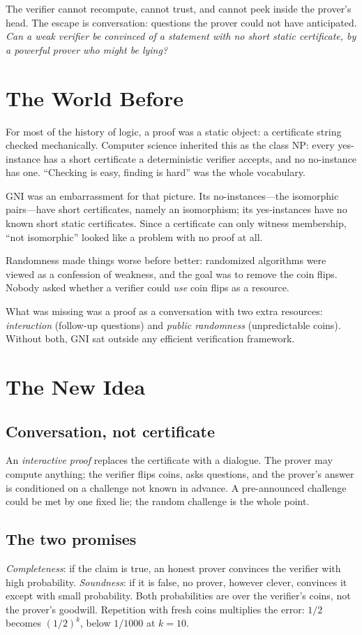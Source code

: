 The verifier cannot recompute, cannot trust, and cannot peek inside the prover's head. The escape is conversation: questions the prover could not have anticipated. \emph{Can a weak verifier be convinced of a statement with no short static certificate, by a powerful prover who might be lying?}

\section{The World Before}
For most of the history of logic, a proof was a static object: a certificate string checked mechanically. Computer science inherited this as the class NP: every yes-instance has a short certificate a deterministic verifier accepts, and no no-instance has one. ``Checking is easy, finding is hard'' was the whole vocabulary.

GNI was an embarrassment for that picture. Its no-instances---the isomorphic pairs---have short certificates, namely an isomorphism; its yes-instances have no known short static certificates. Since a certificate can only witness membership, ``not isomorphic'' looked like a problem with no proof at all.

Randomness made things worse before better: randomized algorithms were viewed as a confession of weakness, and the goal was to remove the coin flips. Nobody asked whether a verifier could \emph{use} coin flips as a resource.

What was missing was a proof as a conversation with two extra resources: \emph{interaction} (follow-up questions) and \emph{public randomness} (unpredictable coins). Without both, GNI sat outside any efficient verification framework.

\section{The New Idea}
\subsection{Conversation, not certificate}
An \emph{interactive proof} replaces the certificate with a dialogue. The prover may compute anything; the verifier flips coins, asks questions, and the prover's answer is conditioned on a challenge not known in advance. A pre-announced challenge could be met by one fixed lie; the random challenge is the whole point.

\subsection{The two promises}
\emph{Completeness}: if the claim is true, an honest prover convinces the verifier with high probability. \emph{Soundness}: if it is false, no prover, however clever, convinces it except with small probability. Both probabilities are over the verifier's coins, not the prover's goodwill. Repetition with fresh coins multiplies the error: $1/2$ becomes $(1/2)^k$, below $1/1000$ at $k=10$.

